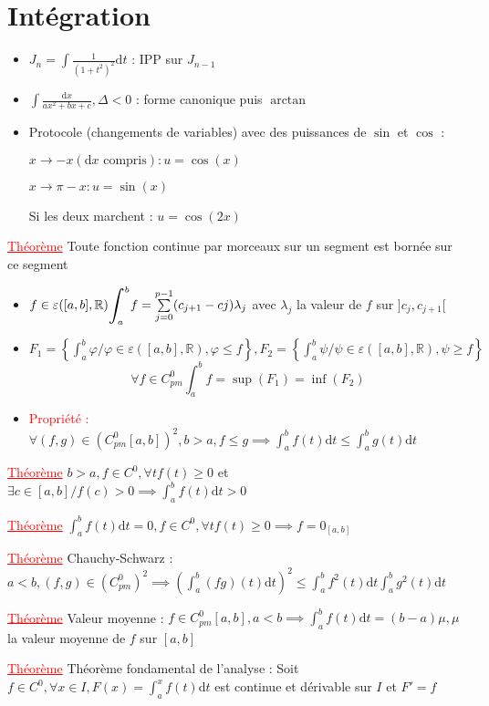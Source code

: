 \documentclass[a4paper, french]{article}
\newcommand{\R}{\mathbb{R}}
\newcommand{\dx}{\mathrm{d}x}
\newcommand{\dt}{\mathrm{d}t}
\newcommand{\De}{\Delta}
\newcommand{\la}{\lambda}
\newcommand{\ep}{\varepsilon}
\newcommand{\som}[2]{\overset{#2}{\underset{#1}{\sum}}}
\newcommand{\thm}{\textcolor{red}{\underline{Théorème} }}
\newcommand{\ppt}{\textcolor{red}{Propriété : }}
\newcommand{\inv}[1]{\frac{1}{#1}}
\newcommand{\acc}[1]{\left\{ #1 \right\}}
\newcommand{\sint}[2]{\vcenter{\hbox{\scaleto[4ex]{\displaystyle\int_{\scriptscriptstyle #1}^{\scriptscriptstyle #2}}{7ex}}}}
\begin{document}
	\section{Intégration}
	\begin{itemize}[label=\(\bullet\)]
	  \item $J_n=\int{\inv{(1+t^2)^2}\dt}$ : IPP sur $J_{n-1}$
	  \item $\int{\frac{\dx}{ax^2+bx+c}}, \De<0$ : forme canonique puis $\arctan$
	  \item Protocole (changements de variables) avec des puissances de $\sin$ et $\cos$ :
		\begin{center}
			$x\rightarrow-x (\dx\text{ compris}) : u=\cos(x)$
	 
			$x\rightarrow \pi-x : u=\sin(x)$
	 
			Si les deux marchent : $u=\cos(2x)$
		\end{center}
	\end{itemize}

	 \thm Toute fonction continue par morceaux sur un segment est bornée sur ce segment
	
	 \begin{itemize}[label=\(\bullet\)]
	  \item $f\in \ep([a,b],\R) \sint{a}{b} f=\som{j=0}{p-1}(c_{j+1}-c{j})\la_j$ avec $\la_j$ la valeur de $f$ sur $]c_j,c_{j+1}[$
	  \item $F_1=\acc{\int_a^b \varphi / \varphi \in \ep([a,b],\R), \varphi \leqslant f}, F_2=\left\{ \int_a^b \psi / \psi \in \ep([a,b],\R), \psi \geqslant f \right\}$
			$$\forall f \in C_{pm}^0 \int_a^b f=\sup(F_1)=\inf(F_2)$$
	  \item \ppt $\forall (f,g) \in (C_{pm}^0[a,b])^2, b>a, f\leqslant g \implies \int_a^b f(t)\dt\leqslant \int_a^b g(t)\dt$
	\end{itemize}

	 \thm $b>a, f \in C^0, \forall t f(t)\geqslant 0$ et $\exists c \in [a,b] /f(c)>0 \implies \int_a^b f(t) \dt >0$ 
	 
	 \thm $\int_a^b f(t) \dt=0, f \in C^0, \forall t f(t)\geqslant 0 \implies f=0_{[a,b]}$ 
	 
	 \thm Chauchy-Schwarz : $a<b, (f,g)\in (C_{pm}^0)^2 \implies (\int_a^b (fg)(t)\dt)^2 \leqslant \int_a^b f^2(t)\dt \int_a^b g^2(t) \dt$ 
	 
	 \thm Valeur moyenne : $f \in C_{pm}^0[a,b], a<b \implies \int_a^b f(t)\dt=(b-a)\mu, \mu$ la valeur moyenne de $f$ sur $[a,b]$ 
	 
	 \thm Théorème fondamental de l'analyse : Soit $f \in C^0, \forall x \in I, F(x)=\int_a^xf(t)\dt$ est continue et dérivable sur $I$ et $F'=f$ 
	 
\end{document}
